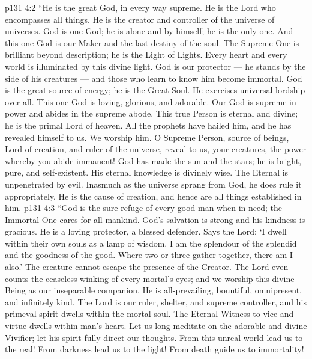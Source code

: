 \vs p131 4:2 \pc “He is the great God, in every way supreme. He is the Lord who encompasses all things. He is the creator and controller of the universe of universes. God is one God; he is alone and by himself; he is the only one. And this one God is our Maker and the last destiny of the soul. The Supreme One is brilliant beyond description; he is the Light of Lights. Every heart and every world is illuminated by this divine light. God is our protector --- he stands by the side of his creatures --- and those who learn to know him become immortal. God is the great source of energy; he is the Great Soul. He exercises universal lordship over all. This one God is loving, glorious, and adorable. Our God is supreme in power and abides in the supreme abode. This true Person is eternal and divine; he is the primal Lord of heaven. All the prophets have hailed him, and he has revealed himself to us. We worship him. O Supreme Person, source of beings, Lord of creation, and ruler of the universe, reveal to us, your creatures, the power whereby you abide immanent! God has made the sun and the stars; he is bright, pure, and self\hyp{}existent. His eternal knowledge is divinely wise. The Eternal is unpenetrated by evil. Inasmuch as the universe sprang from God, he does rule it appropriately. He is the cause of creation, and hence are all things established in him.
\vs p131 4:3 “God is the sure refuge of every good man when in need; the Immortal One cares for all mankind. God’s salvation is strong and his kindness is gracious. He is a loving protector, a blessed defender. Says the Lord: ‘I dwell within their own souls as a lamp of wisdom. I am the splendour of the splendid and the goodness of the good. Where two or three gather together, there am I also.’ The creature cannot escape the presence of the Creator. The Lord even counts the ceaseless winking of every mortal’s eyes; and we worship this divine Being as our inseparable companion. He is all\hyp{}prevailing, bountiful, omnipresent, and infinitely kind. The Lord is our ruler, shelter, and supreme controller, and his primeval spirit dwells within the mortal soul. The Eternal Witness to vice and virtue dwells within man’s heart. Let us long meditate on the adorable and divine Vivifier; let his spirit fully direct our thoughts. From this unreal world lead us to the real! From darkness lead us to the light! From death guide us to immortality!
